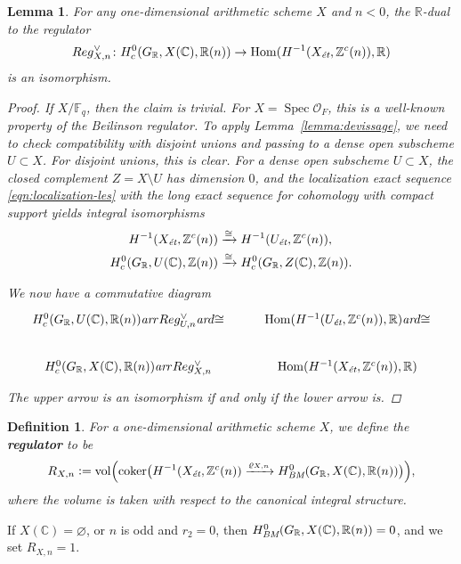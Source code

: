 \documentclass[draft]{article}
\DeclareMathOperator{\coker}{coker}
\DeclareMathOperator{\Hom}{Hom}
\DeclareMathOperator{\Spec}{Spec}
\DeclareMathOperator{\vol}{vol}
\newcommand{\CC}{\mathbb{C}}
\newcommand{\FF}{\mathbb{F}}
\newcommand{\RR}{\mathbb{R}}
\newcommand{\ZZ}{\mathbb{Z}}
\renewcommand{\emptyset}{\varnothing}
\newcommand{\ar}{\text{\it ar}}
\newcommand{\BM}{\text{\it BM}}
\newcommand{\et}{\text{\it \'{e}t}}
\newcommand{\dfn}{\mathrel{\mathop:}=}
\theoremstyle{myplain}
\newtheorem{lemma}[theorem]{Lemma}
\theoremstyle{mydefinition}
\newtheorem{definition}[theorem]{Definition}
\begin{document}
\begin{lemma}
  \label{lemma:regulator-isomorphism}
  For any one-dimensional arithmetic scheme $X$ and $n < 0$, the $\RR$-dual to
  the regulator
  \[ Reg_{X,n}^\vee\colon H^0_c (G_\RR, X(\CC), \RR(n)) \to
    \Hom (H^{-1} (X_\et, \ZZ^c (n)), \RR) \]
  is an isomorphism.

  \begin{proof}
    If $X/\FF_q$, then the claim is trivial. For $X = \Spec \mathcal{O}_F$, this
    is a well-known property of the Beilinson regulator. To apply
    Lemma~\ref{lemma:devissage}, we need to check compatibility with disjoint
    unions and passing to a dense open subscheme $U \subset X$. For disjoint
    unions, this is clear. For a dense open subscheme $U \subset X$, the closed
    complement $Z = X\setminus U$ has dimension $0$, and the localization exact
    sequence \eqref{eqn:localization-les} with the long exact sequence for
    cohomology with compact support yields integral isomorphisms
    \begin{align*}
      H^{-1} (X_\et, \ZZ^c (n)) & \xrightarrow{\cong} H^{-1} (U_\et, \ZZ^c (n)), \\
      H^0_c (G_\RR, U(\CC), \ZZ(n)) & \xrightarrow{\cong} H^0_c (G_\RR, Z(\CC), \ZZ(n)).
    \end{align*}

    We now have a commutative diagram
    \[ \begin{tikzcd}
        H^0_c (G_\RR, U(\CC), \RR(n)) \ar{r}{Reg_{U,n}^\vee} \ar{d}{\cong} &
        \Hom (H^{-1} (U_\et, \ZZ^c (n)), \RR) \ar{d}{\cong} \\
        H^0_c (G_\RR, X(\CC), \RR(n)) \ar{r}{Reg_{X,n}^\vee} &
        \Hom (H^{-1} (X_\et, \ZZ^c (n)), \RR)
      \end{tikzcd} \]
    The upper arrow is an isomorphism if and only if the lower arrow is.
  \end{proof}
\end{lemma}

\begin{definition}
  \label{dfn:regulator}
  For a one-dimensional arithmetic scheme $X$, we define the \textbf{regulator}
  to be
  \[ R_{X,n} \dfn \vol \Bigl(\coker \bigl(
    H^{-1} (X_\et, \ZZ^c (n)) \xrightarrow{\varrho_{X,n}}
    H^0_\BM (G_\RR, X(\CC), \RR(n))
    \bigr)\Bigr), \]
  where the volume is taken with respect to the canonical integral structure.
\end{definition}

If $X(\CC) = \emptyset$, or $n$ is odd and $r_2 = 0$, then
$H^0_\BM (G_\RR, X(\CC), \RR (n)) = 0$, and we set $R_{X,n} = 1$.
\end{document}
